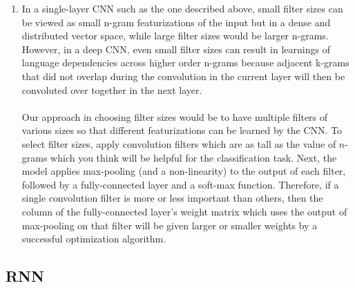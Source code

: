 \documentclass[a4paper]{article}
\begin{document}
\begin{enumerate}
\item{
In a single-layer CNN such as the one described above, small filter sizes can be viewed as small n-gram featurizations of the input but in a dense and distributed vector space, while large filter sizes would be larger n-grams. However, in a deep CNN, even small filter sizes can result in learnings of language dependencies across higher order n-grams because adjacent k-grams that did not overlap during the convolution in the current layer will then be convoluted over together in the next layer. 
\\\\
Our approach in choosing filter sizes would be to have multiple filters of various sizes so that different featurizations can be learned by the CNN. To select filter sizes, apply convolution filters which are as tall as the value of $n$-grams which you think will be helpful for the classification task. Next, the model applies max-pooling (and a non-linearity) to the output of each filter, followed by a fully-connected layer and a soft-max function. Therefore, if a single convolution filter is more or less important than others, then the column of the fully-connected layer's weight matrix which uses the output of max-pooling on that filter will be given larger or smaller weights by a successful optimization algorithm.
}
\end{enumerate}

\subsection{RNN}
\end{document}
